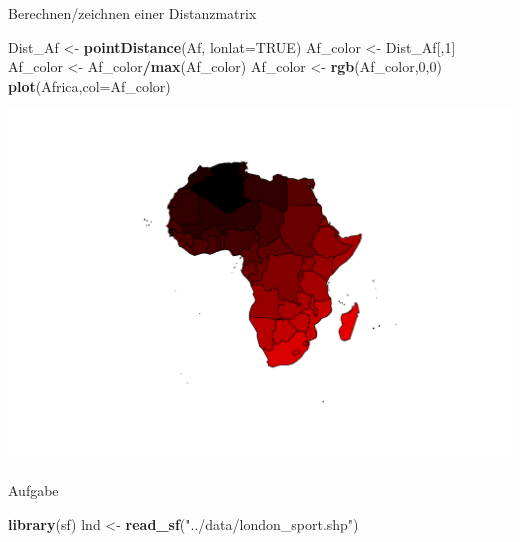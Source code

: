 \documentclass[ignorenonframetext,]{beamer}
\newenvironment{Shaded}{\begin{snugshade}}{\end{snugshade}}
\newcommand{\KeywordTok}[1]{\textcolor[rgb]{0.13,0.29,0.53}{\textbf{#1}}}
\newcommand{\DataTypeTok}[1]{\textcolor[rgb]{0.13,0.29,0.53}{#1}}
\newcommand{\DecValTok}[1]{\textcolor[rgb]{0.00,0.00,0.81}{#1}}
\newcommand{\StringTok}[1]{\textcolor[rgb]{0.31,0.60,0.02}{#1}}
\newcommand{\OtherTok}[1]{\textcolor[rgb]{0.56,0.35,0.01}{#1}}
\newcommand{\OperatorTok}[1]{\textcolor[rgb]{0.81,0.36,0.00}{\textbf{#1}}}
\newcommand{\NormalTok}[1]{#1}
\begin{document}
\begin{frame}[fragile]{Berechnen/zeichnen einer Distanzmatrix}

\begin{Shaded}
\begin{Highlighting}[]
\NormalTok{Dist_Af <-}\StringTok{ }\KeywordTok{pointDistance}\NormalTok{(Af, }\DataTypeTok{lonlat=}\OtherTok{TRUE}\NormalTok{)}
\NormalTok{Af_color <-}\StringTok{ }\NormalTok{Dist_Af[,}\DecValTok{1}\NormalTok{]}
\NormalTok{Af_color <-}\StringTok{ }\NormalTok{Af_color}\OperatorTok{/}\KeywordTok{max}\NormalTok{(Af_color)}
\NormalTok{Af_color <-}\StringTok{ }\KeywordTok{rgb}\NormalTok{(Af_color,}\DecValTok{0}\NormalTok{,}\DecValTok{0}\NormalTok{)}
\KeywordTok{plot}\NormalTok{(Africa,}\DataTypeTok{col=}\NormalTok{Af_color)}
\end{Highlighting}
\end{Shaded}

\includegraphics{spdep_files/figure-beamer/Africa Distance-1.pdf}

\end{frame}

\begin{frame}[fragile]{Aufgabe}

\begin{Shaded}
\begin{Highlighting}[]
\KeywordTok{library}\NormalTok{(sf)}
\NormalTok{lnd <-}\StringTok{ }\KeywordTok{read_sf}\NormalTok{(}\StringTok{"../data/london_sport.shp"}\NormalTok{)}
\end{Highlighting}
\end{Shaded}

\end{frame}
\end{document}
